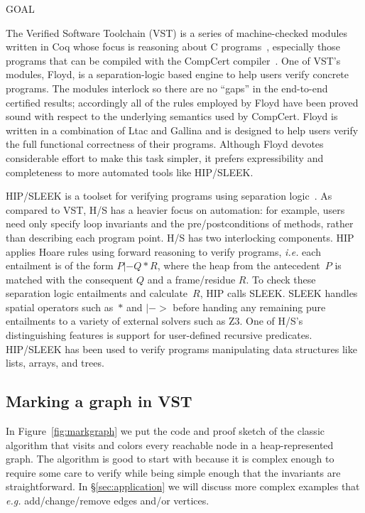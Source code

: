 GOAL

The Verified Software Toolchain (VST) is a series of machine-checked modules written in Coq whose focus is reasoning about C programs~\cite{appel:programlogics}, especially those programs that can be compiled with the CompCert compiler~\cite{leroy:compcert}.  One of VST's modules, Floyd, is a separation-logic based engine to help users
verify concrete programs.  The modules interlock so there are no ``gaps'' in the end-to-end certified results; accordingly all of the rules employed by Floyd have been proved sound with respect to the underlying semantics used by CompCert.  Floyd is written in a combination of Ltac and Gallina and is designed to help users verify the full functional correctness of their programs.  Although Floyd devotes considerable effort to make this task simpler, it prefers expressibility and completeness to more automated tools like HIP/SLEEK.

HIP/SLEEK is a toolset for verifying programs using separation logic~\cite{chin:hipsleek}.  As compared to VST, H/S has a heavier focus on automation: for example, users need only specify loop invariants and the pre/postconditions of methods, rather than describing each program point.  H/S has two interlocking components.  HIP applies Hoare rules using forward reasoning to verify programs, \emph{i.e.} each entailment is of the form $P |- Q * R$, where the heap from the antecedent~$P$ is matched with the consequent $Q$ and a frame/residue $R$. To check these separation logic entailments and calculate~$R$, HIP calls SLEEK.  SLEEK handles spatial operators such as~$*$ and $|->$ before handing any remaining pure entailments to a variety of external solvers such as Z3.  One of H/S's distinguishing features is support for user-defined recursive predicates.  HIP/SLEEK has been used to verify programs manipulating data structures like lists, arrays, and trees.

\subsection{Marking a graph in VST}



In Figure~\ref{fig:markgraph} we put the code and proof sketch of the classic  algorithm that visits and colors every reachable node in a heap-represented graph.  The  algorithm is good to start with because it is complex enough to require some care to verify while being simple enough that the invariants are straightforward.  In \S\ref{sec:application} we will discuss more complex examples that \emph{e.g.} add/change/remove edges and/or vertices.

